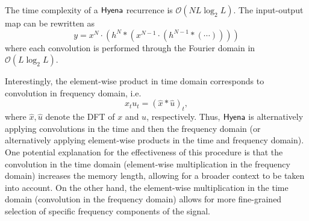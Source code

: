 %
\begin{remark}
The time complexity of a $\sf Hyena$ recurrence is $\mathcal{O}(N L \log_2 L)$. The input-output map can be rewritten as 
\[
y = x^N \cdot (h^N * ( x^{N-1} \cdot (h^{N-1} * (\cdots))))
\]
where each convolution is performed through the Fourier domain in $\mathcal{O}(L \log_2 L)$.
\end{remark}
%
Interestingly, the element-wise product in time domain corresponds to convolution in frequency domain, i.e.
%
\[ x_tu_t = (\hat x * \hat u)_t, \]
%
where $\hat x,\hat u$ denote the DFT of $x$ and $u$, respectively. Thus, $\sf Hyena$ is alternatively applying convolutions in the time and then the frequency domain (or alternatively applying element-wise products in the time and frequency domain). One potential explanation for the effectiveness of this procedure is that the convolution in the time domain (element-wise multiplication in the frequency domain) increases the memory length, allowing for a broader context to be taken into account. On the other hand, the element-wise multiplication in the time domain (convolution in the frequency domain) allows for more fine-grained selection of specific frequency components of the signal.
%
